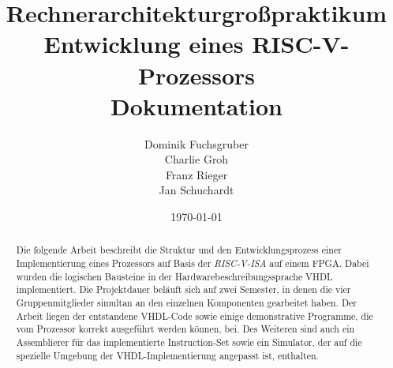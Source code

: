 \documentclass{article}
\title{\vspace{50pt}\large \textbf{Rechnerarchitekturgro\ss{}praktikum} \\[10pt] Entwicklung eines RISC-V-Prozessors \\[10pt] \Huge Dokumentation}
\author{Dominik Fuchsgruber \\ Charlie Groh \\ Franz Rieger \\ Jan Schuchardt}
\date{\today}
\begin{document}
\maketitle
\vspace{50pt}
\begin{abstract}
\noindent Die folgende Arbeit beschreibt die Struktur und den Entwicklungsprozess einer
Implementierung eines Prozessors auf Basis der \textit{RISC-V-ISA} auf einem FPGA. Dabei wurden die logischen
Bausteine in der Hardwarebeschreibungssprache VHDL implementiert. Die
Projektdauer bel\"auft sich auf zwei Semester, in denen die vier
Gruppenmitglieder simultan an den einzelnen Komponenten gearbeitet haben. Der
Arbeit liegen der entstandene VHDL-Code sowie einige
demonstrative Programme, die vom Prozessor korrekt ausgef\"uhrt werden
k\"onnen, bei. Des Weiteren sind auch ein Assemblierer f\"ur das implementierte
Instruction-Set sowie ein Simulator, der auf die spezielle Umgebung der
VHDL-Implementierung angepasst ist, enthalten.
\end{abstract}
\clearpage{}
\begingroup
\let\clearpage\relax
\let\textbf\relax
\tableofcontents
\listoftables
\listoffigures
\endgroup
\clearpage{}








\appendix{}

\clearpage{}

\clearpage{}

\clearpage{}

\clearpage{}

\clearpage{}
\end{document}
